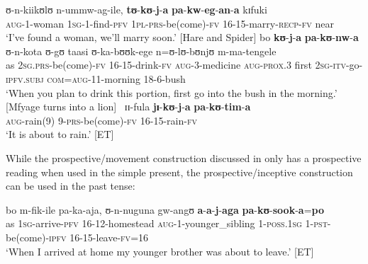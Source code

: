 \begin{exe}
\ex \label{exPRSpakuProspectiveNearIntention}
\gll ʊ-n-kiikʊlʊ n-ummw-ag-ile, \textbf{tʊ}-\textbf{kʊ}-\textbf{j}-\textbf{a} \textbf{pa}-\textbf{kw}-\textbf{eg}-\textbf{an}-\textbf{a} kɪfuki\\
\textsc{aug}-1-woman \textsc{1sg}-1-find-\textsc{pfv} \textsc{1pl}-\textsc{prs}-be(come)-\textsc{fv} 16-15-marry-\textsc{recp}-\textsc{fv} near\\
\glt `I've found a woman, we'll marry soon.' [Hare and Spider]
\ex \label{exPRSpakuProspectiveIntention}
\gll bo \textbf{kʊ}-\textbf{j}-\textbf{a} \textbf{pa}-\textbf{kʊ}-\textbf{nw}-\textbf{a} ʊ-n-kota ʊ-gʊ taasi ʊ-ka-bʊʊk-ege n=ʊ-lʊ-bʊnjʊ m-ma-tengele\\
as \textsc{2sg.prs}-be(come)-\textsc{fv} 16-15-drink-\textsc{fv} \textsc{aug}-3-medicine \textsc{aug}-\textsc{prox}.3 first \textsc{2sg}-\textsc{itv}-go-\textsc{ipfv.subj} \textsc{com}=\textsc{aug}-11-morning 18-6-bush\\
\glt `When you plan to drink this portion, first go into the bush in the morning.' [Mfyage turns into a lion]\
\ex %
\gll ɪɪ-fula \textbf{jɪ}-\textbf{kʊ}-\textbf{j}-\textbf{a} \textbf{pa}-\textbf{kʊ}-\textbf{tim}-\textbf{a}\\
\textsc{aug}-rain(9) 9-\textsc{prs}-be(come)-\textsc{fv} 16-15-rain-\textsc{fv}\\
\glt \lq It is about to rain.' [ET]  
\end{exe}

While the prospective/movement construction discussed in  only has a prospective reading when used in the simple present, the prospective/inceptive construction can be used in the past tense:
\begin{exe}
\ex \gll bo m-fik-ile pa-ka-aja, ʊ-n-nuguna gw-angʊ \textbf{a}-\textbf{a}-\textbf{j}-\textbf{aga} \textbf{pa}-\textbf{kʊ}-\textbf{sook}-\textbf{a}=\textbf{po}\\
as \textsc{1sg}-arrive-\textsc{pfv} 16-12-homestead \textsc{aug}-1-younger\_sibling 1-\textsc{poss.1sg} 1-\textsc{pst}-be(come)-\textsc{ipfv} 16-15-leave-\textsc{fv}=16\\
\glt \lq When I arrived at home my younger brother was about to leave.' [ET]
\end{exe}

